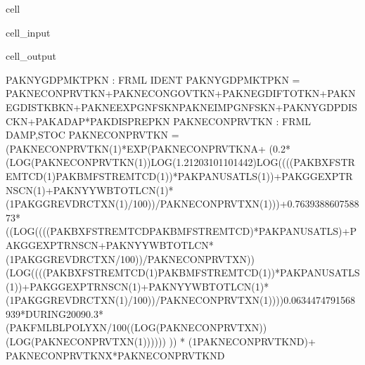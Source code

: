 \documentclass[letterpaper,10pt,english]{jupyterBook}
\begin{document}
\begin{sphinxuseclass}{cell}\begin{sphinxVerbatimInput}

\begin{sphinxuseclass}{cell_input}
\begin{sphinxVerbatim}[commandchars=\\\{\}]
\PYG{p}{[}\PYG{p}{]}
\end{sphinxVerbatim}

\end{sphinxuseclass}\end{sphinxVerbatimInput}
\begin{sphinxVerbatimOutput}

\begin{sphinxuseclass}{cell_output}
\begin{sphinxVerbatim}[commandchars=\\\{\}]
PAKNYGDPMKTPKN : FRML \PYGZlt{}IDENT\PYGZgt{} PAKNYGDPMKTPKN = PAKNECONPRVTKN+PAKNECONGOVTKN+PAKNEGDIFTOTKN+PAKNEGDISTKBKN+PAKNEEXPGNFSKN\PYGZhy{}PAKNEIMPGNFSKN+PAKNYGDPDISCKN+PAKADAP*PAKDISPREPKN \PYGZdl{}
PAKNECONPRVTKN : FRML \PYGZlt{}DAMP,STOC\PYGZgt{} PAKNECONPRVTKN = (PAKNECONPRVTKN(\PYGZhy{}1)*EXP(PAKNECONPRVTKN\PYGZus{}A+ (\PYGZhy{}0.2*(LOG(PAKNECONPRVTKN(\PYGZhy{}1))\PYGZhy{}LOG(1.21203101101442)\PYGZhy{}LOG((((PAKBXFSTREMTCD(\PYGZhy{}1)\PYGZhy{}PAKBMFSTREMTCD(\PYGZhy{}1))*PAKPANUSATLS(\PYGZhy{}1))+PAKGGEXPTRNSCN(\PYGZhy{}1)+PAKNYYWBTOTLCN(\PYGZhy{}1)*(1\PYGZhy{}PAKGGREVDRCTXN(\PYGZhy{}1)/100))/PAKNECONPRVTXN(\PYGZhy{}1)))+0.763938860758873*((LOG((((PAKBXFSTREMTCD\PYGZhy{}PAKBMFSTREMTCD)*PAKPANUSATLS)+PAKGGEXPTRNSCN+PAKNYYWBTOTLCN*(1\PYGZhy{}PAKGGREVDRCTXN/100))/PAKNECONPRVTXN))\PYGZhy{}(LOG((((PAKBXFSTREMTCD(\PYGZhy{}1)\PYGZhy{}PAKBMFSTREMTCD(\PYGZhy{}1))*PAKPANUSATLS(\PYGZhy{}1))+PAKGGEXPTRNSCN(\PYGZhy{}1)+PAKNYYWBTOTLCN(\PYGZhy{}1)*(1\PYGZhy{}PAKGGREVDRCTXN(\PYGZhy{}1)/100))/PAKNECONPRVTXN(\PYGZhy{}1))))\PYGZhy{}0.0634474791568939*DURING\PYGZus{}2009\PYGZhy{}0.3*(PAKFMLBLPOLYXN/100\PYGZhy{}((LOG(PAKNECONPRVTXN))\PYGZhy{}(LOG(PAKNECONPRVTXN(\PYGZhy{}1)))))) )) * (1\PYGZhy{}PAKNECONPRVTKN\PYGZus{}D)+ PAKNECONPRVTKN\PYGZus{}X*PAKNECONPRVTKN\PYGZus{}D \PYGZdl{}
\end{sphinxVerbatim}

\end{sphinxuseclass}\end{sphinxVerbatimOutput}

\end{sphinxuseclass}
\end{document}
